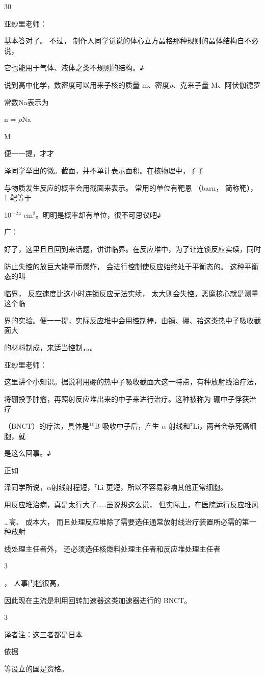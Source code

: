 30\par
亚纱里老师：\par
基本答对了。 不过， 制作人同学觉说的体心立方晶格那种规则的晶体结构自不必说，\par
它也能用于气体、液体之类不规则的结构。♪\par
说到高中化学，数密度可以用来子核的质量 m、密度$\rho$、克来子量 M、阿伏伽德罗\par
常数Na表示为\par
n = $\rho$Na\par
M\par
便一一提，才才\par
泽同学举出的微。截面，并不单计表示面积。在核物理中，子子\par
与物质发生反应的概率会用截面来表示。 常用的单位有靶恩 （barn， 简称靶），1 靶等于\par
10$^{-}$$^{2}$$^{4}$ cm$^{2}$。明明是概率却有单位，很不可思议吧♪\par
广：\par
好了，这里且且回到来话题，讲讲临界。在反应堆中，为了让连锁反应实续，同时\par
防止失控的放巨大能量而爆炸， 会进行控制使反应始终处于平衡态的。 这种平衡态的叫\par
临界， 反应速度比这小时连锁反应无法实续， 太大则会失控。恶魔核心就是测量这个临\par
界的实验。便一一提，实际反应堆中会用控制棒，由镉、硼、铪这类热中子吸收截面大\par
的材料制成，来适当控制，。。\par
亚纱里老师：\par
这里讲个小知识。据说利用硼的热中子吸收截面大这一特点，有种放射线治疗法，\par
将硼投予肿瘤，再照射反应堆出来的中子来进行治疗。这种被称为 硼中子俘获治疗\par
（BNCT）的疗法，具体是$^{1}$$^{0}$B 吸收中子后，产生 $\alpha$ 射线和$^{7}$Li，两者会杀死癌细胞，就\par
是这么回事。♪\par
正如\par
泽同学所说，$\alpha$射线射程短，$^{7}$Li 更短，所以不容易影响其他正常细胞。\par
用反应堆治病，真是太行大了……虽说想这么说， 但实际上，在医院运行反应堆风\par
…高、 成本大， 而且处理反应堆除了需要选任通常放射线治疗装置所必需的第一种放射\par
线处理主任者外， 还必须选任核燃料处理主任者和反应堆处理主任者\par
3\par
， 人事门槛很高，\par
因此现在主流是利用回转加速器这类加速器进行的 BNCT。\par
3\par
译者注：这三者都是日本\par
依据\par
等设立的国是资格。\par

